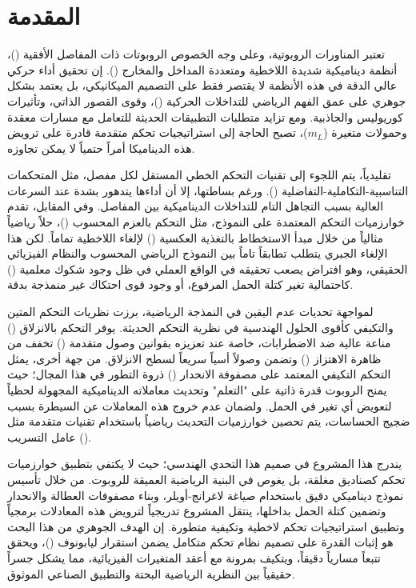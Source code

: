 \chapter{المقدمة }
\label{ch:introduction}

تعتبر المناورات الروبوتية، وعلى وجه الخصوص الروبوتات ذات المفاصل الأفقية ()، أنظمة ديناميكية شديدة اللاخطية ومتعددة المداخل والمخارج (). إن تحقيق أداء حركي عالي الدقة في هذه الأنظمة لا يقتصر فقط على التصميم الميكانيكي، بل يعتمد بشكل جوهري على عمق الفهم الرياضي للتداخلات الحركية ()، وقوى القصور الذاتي، وتأثيرات كوريوليس والجاذبية. ومع تزايد متطلبات التطبيقات الحديثة للتعامل مع مسارات معقدة وحمولات متغيرة ($m_L$)، تصبح الحاجة إلى استراتيجيات تحكم متقدمة قادرة على ترويض هذه الديناميكا أمراً حتمياً لا يمكن تجاوزه.

تقليدياً، يتم اللجوء إلى تقنيات التحكم الخطي المستقل لكل مفصل، مثل المتحكمات التناسبية-التكاملية-التفاضلية (). ورغم بساطتها، إلا أن أداءها يتدهور بشدة عند السرعات العالية بسبب التجاهل التام للتداخلات الديناميكية بين المفاصل. وفي المقابل، تقدم خوارزميات التحكم المعتمدة على النموذج، مثل التحكم بالعزم المحسوب ()، حلاً رياضياً مثالياً من خلال مبدأ الاستخطاط بالتغذية العكسية () لإلغاء اللاخطية تماماً. لكن هذا الإلغاء الجبري يتطلب تطابقاً تاماً بين النموذج الرياضي المحسوب والنظام الفيزيائي الحقيقي، وهو افتراض يصعب تحقيقه في الواقع العملي في ظل وجود شكوك معلمية () كاحتمالية تغير كتلة الحمل المرفوع، أو وجود قوى احتكاك غير منمذجة بدقة.

لمواجهة تحديات عدم اليقين في النمذجة الرياضية، برزت نظريات التحكم المتين والتكيفي كأقوى الحلول الهندسية في نظرية التحكم الحديثة. يوفر التحكم بالانزلاق () مناعة عالية ضد الاضطرابات، خاصة عند تعزيزه بقوانين وصول متقدمة () تخفف من ظاهرة الاهتزاز () وتضمن وصولاً أسياً سريعاً لسطح الانزلاق. من جهة أخرى، يمثل التحكم التكيفي المعتمد على مصفوفة الانحدار () ذروة التطور في هذا المجال؛ حيث يمنح الروبوت قدرة ذاتية على "التعلم" وتحديث معاملاته الديناميكية المجهولة لحظياً لتعويض أي تغير في الحمل. ولضمان عدم خروج هذه المعاملات عن السيطرة بسبب ضجيج الحساسات، يتم تحصين خوارزميات التحديث رياضياً باستخدام تقنيات متقدمة مثل عامل التسريب ().

يندرج هذا المشروع في صميم هذا التحدي الهندسي؛ حيث لا يكتفي بتطبيق خوارزميات تحكم كصناديق مغلقة، بل يغوص في البنية الرياضية العميقة للروبوت. من خلال تأسيس نموذج ديناميكي دقيق باستخدام صياغة لاغرانج-أويلر، وبناء مصفوفات العطالة والانحدار وتضمين كتلة الحمل بداخلها، ينتقل المشروع تدريجياً لترويض هذه المعادلات برمجياً وتطبيق استراتيجيات تحكم لاخطية وتكيفية متطورة. إن الهدف الجوهري من هذا البحث هو إثبات القدرة على تصميم نظام تحكم متكامل يضمن استقرار ليابونوف ()، ويحقق تتبعاً مسارياً دقيقاً، ويتكيف بمرونة مع أعقد المتغيرات الفيزيائية، مما يشكل جسراً حقيقياً بين النظرية الرياضية البحتة والتطبيق الصناعي الموثوق.